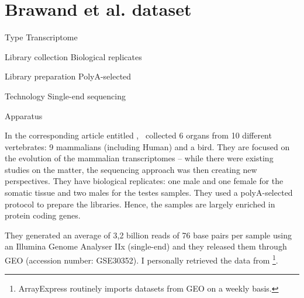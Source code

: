 \chapter{Brawand et al. dataset}
\label{ch:vtData}

\begin{eqlist}
    \item[Type] Transcriptome
    \item[Library collection] Biological replicates
    \item[Library preparation] PolyA-selected
    \item[Technology] Single-end sequencing
    \item[Apparatus]
\end{eqlist}

In the corresponding article entitled ,
 \citet{VTpaper}~collected 6 organs from 10 different vertebrates:
 9 mammalians (including Human) and a bird. They are focused on the
 evolution of the mammalian transcriptomes -- while there were existing studies
 on the matter, the sequencing approach was then creating new perspectives.
 They have biological replicates: one male
 and one female for the somatic tissue and two males for the testes samples.
 They used a
 polyA-selected protocol to prepare the libraries. Hence, the samples are largely
 enriched in protein coding genes.

 They generated an average of 3,2 billion reads of 76 base pairs per sample
 using an Illumina Genome Analyser IIx (single-end) and they released them
 through \gls{GEO} (accession number: GSE30352).
 I personally retrieved the data from
 \footnote{ArrayExpress routinely imports
 datasets from \gls{GEO} on a weekly basis.}.

